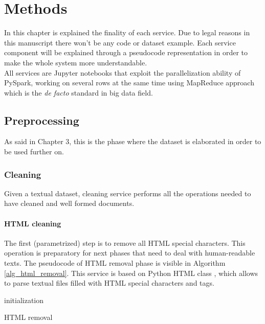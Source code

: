 \documentclass[\main/main.tex]{subfiles}
\begin{document}
\chapter{Methods}
\label{methods}
In this chapter is explained the finality of each service. Due to legal reasons in this manuscript there won't be any code or dataset example. Each service component will be explained through a pseudocode representation in order to make the whole system more understandable.\\
All services are Jupyter notebooks that exploit the parallelization ability of PySpark, working on several rows at the same time using MapReduce approach which is the \emph{de facto} standard in big data field.
\section{Preprocessing}
As said in Chapter 3, this is the phase where the dataset is elaborated in order to be used further on. 
\subsection{Cleaning}
Given a textual dataset, cleaning service performs all the operations needed to have cleaned and well formed documents.
\subsubsection{HTML cleaning}
The first (parametrized) step is to remove all HTML special characters. This operation is preparatory for next phases that need to deal with human-readable texts. The pseudocode of HTML removal phase is visible in Algorithm \ref{alg_html_removal}. This service is based on Python HTML class \cite{html_parser}, which allows to parse textual files filled with HTML special characters and tags.
\begin{center}
    \begin{algorithm}[H]
     initialization \\
     \caption{HTML removal}
     \label{alg_html_removal}
    \end{algorithm}
\end{center}
\end{document}
